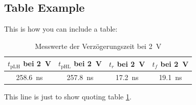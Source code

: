 \subsection{Table Example}
This is how you can include a table:

\begin{table}[!htb] %
\centering
\begin{tabular}{c c c c}
\hline
{$t_{\mathrm{pLH}}$ bei \qty{2}{\volt}} &
{$t_{\mathrm{pHL}}$ bei \qty{2}{\volt}} &
{$t_r$ bei \qty{2}{\volt}} &
{$t_f$ bei \qty{2}{\volt}} \\
\hline
\qty{258,6}{\ns} & \qty{257,8}{\ns} & \qty{17,2}{\ns} & \qty{19,1}{\ns} \\
\hline
\end{tabular}
\caption{Messwerte der Verzögerungszeit bei \qty{2}{\volt}}
\label{tab:messwerte2v}
\end{table}

This line is just to show quoting table \ref{tab:messwerte2v}.